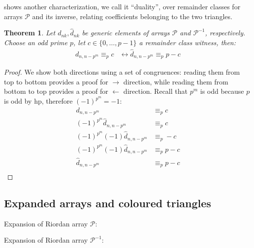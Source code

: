 \documentclass[11pt,a4paper]{article} %
\newtheorem{theorem}{Theorem}[section]
\begin{document}
    shows another characterization, we call it ``duality'', 
    over remainder classes for arrays $\mathcal{P}$ and its inverse, relating coefficients
    belonging to the two triangles.
    \begin{theorem}
        Let $d_{nk}, \hat{d}_{nk}$ be generic elements of arrays $\mathcal{P}$ and $\mathcal{P}^{-1}$,
        respectively. Choose an odd prime $p$, let $c\in \lbrace 0, \ldots, p-1 \rbrace$ a remainder class
        witness, then:
        \begin{displaymath}
            \begin{split}
                d_{n,n-p^{m}} \equiv_{p} c &\leftrightarrow \hat{d}_{n,n-p^{m}} \equiv_{p} p-c
            \end{split}
        \end{displaymath}
    \end{theorem}
    \begin{proof}
    We show both directions using a set of congruences: reading them from top to bottom provides a 
    proof for $\rightarrow$ direction, while reading them from bottom to top provides a proof for 
    $\leftarrow$ direction. Recall that $p^m$ is odd because $p$ is odd by hp, therefore $(-1)^{p^m} = -1$:
    \begin{displaymath}
        \begin{split}
            d_{n,n-p^{m}} &\equiv_{p} c \\
            (-1)^{p^m}\hat{d}_{n,n-p^{m}} &\equiv_{p} c \\
            (-1)^{p^m }(-1)\hat{d}_{n,n-p^{m}} &\equiv_{p} -c \\
            (-1)^{p^m }(-1)\hat{d}_{n,n-p^{m}} &\equiv_{p} p -c \\
            \hat{d}_{n,n-p^{m}} &\equiv_{p} p -c \\
        \end{split}
    \end{displaymath}
    \end{proof}


    \subsection{Expanded arrays and coloured triangles}

    Expansion of Riordan array $\mathcal{P}$:
    
    Expansion of Riordan array $\mathcal{P}^{-1}$:
    
\end{document}
